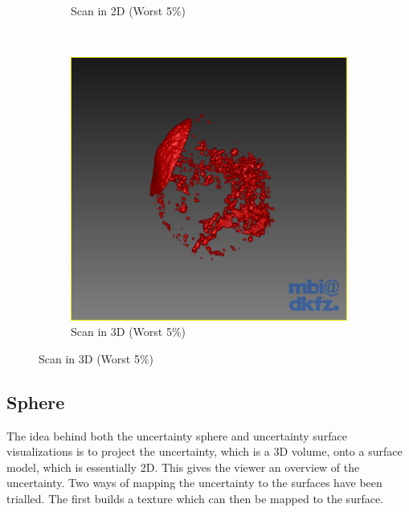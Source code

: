 \begin{figure}[H]
\begin{subfigure}[b]{0.5\textwidth}
    \caption{Scan in 2D (Worst 5$\%$)}
    \label{fig:thresholdingresultsscan2d}
  \end{subfigure}%
  ~ %
  \begin{subfigure}[b]{0.5\textwidth}
    \includegraphics[width=\textwidth]{images/thresholding/results/scan_3d.png}
    \caption{Scan in 3D (Worst 5$\%$)}
    \label{fig:thresholdingresultsscan3d}
  \end{subfigure}
\end{figure}


\clearpage
\subsection{Sphere}\label{method:sphere}
The idea behind both the uncertainty sphere and uncertainty surface visualizations is to project the uncertainty, which is a 3D volume, onto a surface model, which is essentially 2D. This gives the viewer an overview of the uncertainty. Two ways of mapping the uncertainty to the surfaces have been trialled. The first builds a texture which can then be mapped to the surface.

